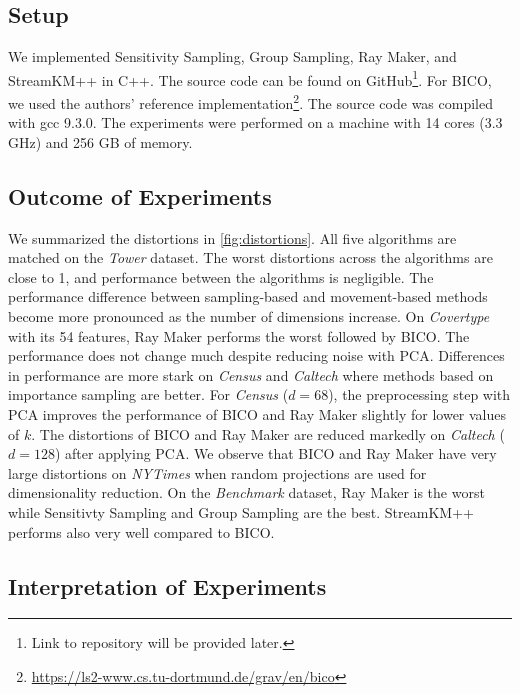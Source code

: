 \subsection{Setup}
We implemented Sensitivity Sampling, Group Sampling, Ray Maker, and StreamKM++ in C++. The source code can be found on GitHub\footnote{Link to repository will be provided later.}. For BICO, we used the authors' reference implementation\footnote{\url{https://ls2-www.cs.tu-dortmund.de/grav/en/bico}}. The source code was compiled with gcc 9.3.0. The experiments were performed on a machine with 14 cores (3.3 GHz) and 256 GB of memory.



\subsection{Outcome of Experiments}
We summarized the distortions in \cref{fig:distortions}.
All five algorithms are matched on the \textit{Tower} dataset. The worst distortions across the algorithms are close to 1, and performance between the algorithms is negligible. The performance difference between sampling-based and movement-based methods become more pronounced as the number of dimensions increase. On \textit{Covertype} with its 54 features, Ray Maker performs the worst followed by BICO. The performance does not change much despite reducing noise with PCA. Differences in performance are more stark on \textit{Census} and \textit{Caltech} where methods based on importance sampling are better. For \textit{Census} ($d=68$), the preprocessing step with PCA improves the performance of BICO and Ray Maker slightly for lower values of $k$. The distortions of BICO and Ray Maker are reduced markedly on \textit{Caltech} ($d=128$) after applying PCA. We observe that BICO and Ray Maker have very large distortions on \textit{NYTimes} when random projections are used for dimensionality reduction. On the \textit{Benchmark} dataset, Ray Maker is the worst while Sensitivty Sampling and Group Sampling are the best. StreamKM++ performs also very well compared to BICO.


\subsection{Interpretation of Experiments}


